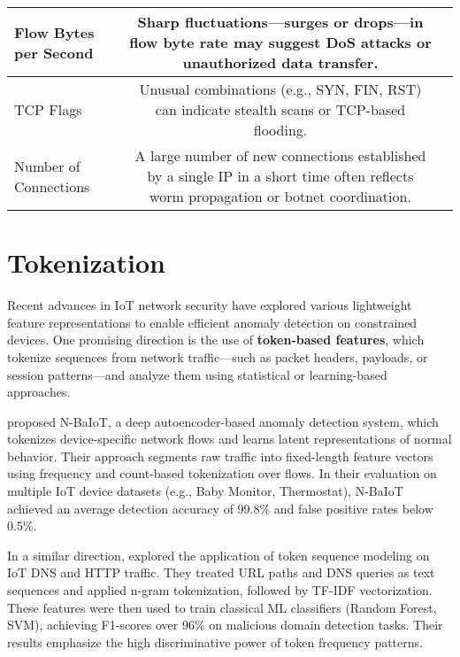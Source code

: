 \begin{ZhChapter}
\begin{table*}[htbp]
{{\begin{tabular}{| l | c | p{8.5cm} |}
                    \hline
                    Flow Bytes per Second       \cite{tang2016deep}                & Sharp fluctuations—surges or drops—in flow byte rate may suggest DoS attacks or unauthorized data transfer.                                                                             \\
                    \hline
                    TCP Flags                  \cite{sharafaldin2018cicflowmeter}  & Unusual combinations (e.g., SYN, FIN, RST) can indicate stealth scans or TCP-based flooding.                                                                                            \\
                    \hline
                    Number of Connections       \cite{tang2016deep}                & A large number of new connections established by a single IP in a short time often reflects worm propagation or botnet coordination.                                                    \\
                    \hline
                \end{tabular}
            }}
    \end{table*}






    \section{Tokenization}
    Recent advances in IoT network security have explored various lightweight feature representations to enable efficient anomaly detection on constrained devices. One promising direction is the use of \textbf{token-based features}, which tokenize sequences from network traffic—such as packet headers, payloads, or session patterns—and analyze them using statistical or learning-based approaches.

    \cite{meidan2018n} proposed N-BaIoT, a deep autoencoder-based anomaly detection system, which tokenizes device-specific network flows and learns latent representations of normal behavior. Their approach segments raw traffic into fixed-length feature vectors using frequency and count-based tokenization over flows. In their evaluation on multiple IoT device datasets (e.g., Baby Monitor, Thermostat), N-BaIoT achieved an average detection accuracy of 99.8\% and false positive rates below 0.5\%.

    In a similar direction, \cite{rahman2020token} explored the application of token sequence modeling on IoT DNS and HTTP traffic. They treated URL paths and DNS queries as text sequences and applied n-gram tokenization, followed by TF-IDF vectorization. These features were then used to train classical ML classifiers (Random Forest, SVM), achieving F1-scores over 96\% on malicious domain detection tasks. Their results emphasize the high discriminative power of token frequency patterns.


\end{ZhChapter}
